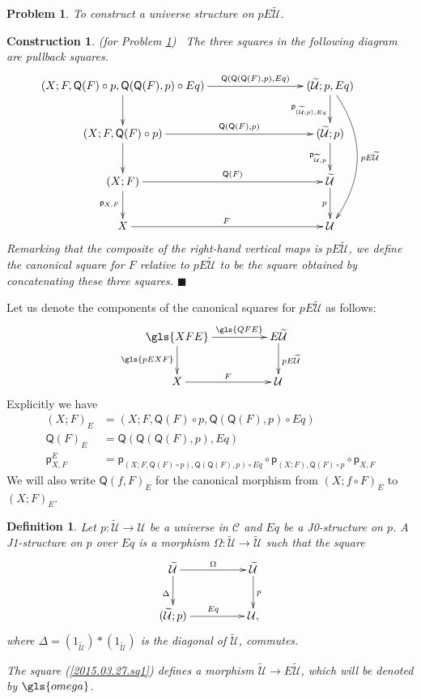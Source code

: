\documentclass[12pt]{article}
\numberwithin{equation}{section}
\newenvironment{eq}{\begin{equation}}{\end{equation}}
\newtheorem{definition}[proposition]{Definition}
\newtheorem{problem}[proposition]{Problem}
\newtheorem{construction0}[proposition]{Construction}
\newenvironment{construction}[1]{\begin{construction0}(for Problem \ref{#1})\ }{$\blacksquare$ \end{construction0}}
\newcommand{\sr}{\rightarrow}
\newcommand{\wt}{\widetilde}
\newcommand{\C}{{\mathcal C}}  %
\newcommand{\id}{1}            %
\newcommand{\p}{\mathsf{p}}
\newcommand{\U}{\mathcal{U}}
\newcommand{\Q}{\mathsf{Q}}
\begin{document}
\begin{problem}
\label{2015.05.08.prob1} To construct a universe structure on $pE\wt{\U}$.
\end{problem}
%
\begin{construction}{2015.05.08.prob1}\rm
\label{2015.05.08.constr1} The three squares in the following diagram are pullback squares.
\begin{eq}
  \begin{xy}
    \xymatrix@C=7pc{
      (X;F,\Q(F)\circ p, \Q(\Q(F),p)\circ Eq) \ar[r]^-{\Q(\Q(\Q(F),p),Eq)} \ar[d] & (\wt{\U}; p, Eq) \ar[d]_{\p_{(\wt{\U};p),Eq}} \ar@/^2pc/[ddd]^{pE\wt{\U}} \\
      (X;F,\Q(F)\circ p) \ar[r]^-{\Q(\Q(F),p)} \ar[d]                             & (\wt{\U};p) \ar[d]_{\p_{\wt{\U},p}} \\
      (X;F) \ar[r]^-{\Q(F)} \ar[d]_{\p_{X,F}}                                       & \wt{\U} \ar[d]_{p} \\
      X \ar[r]^{F}                                                                & \U
    }
  \end{xy}
\end{eq}%
Remarking that the composite of the right-hand vertical maps is $pE\wt{\U}$, we
define the canonical square for $F$ relative to $pE\wt{\U}$ to be the
square obtained by concatenating these three squares.
\end{construction}
%
Let us denote the components of the canonical squares for $pE\wt{\U}$ as
follows:
%
$$
\begin{xy}
          \xymatrix@C=4pc{ \gls{XFE} \ar[r]^-{\gls{QFE}} \ar[d]_{\gls{pEXF}} &
            E\wt{\U} \ar[d]^{pE\wt{\U}}\\ X \ar[r]^{F} & \U }
\end{xy}
$$
%
Explicitly we have
%
\begin{align*}
  (X;F)_{E}&=(X;F,\Q(F)\circ p, \Q(\Q(F),p)\circ Eq) \\
  \Q(F)_{E}&=\Q(\Q(\Q(F),p),Eq) \\
  \p_{X,F}^E&=\p_{(X;F,\Q(F)\circ p),\Q(\Q(F),p)\circ Eq}\circ \p_{(X;F),\Q(F)\circ p}\circ \p_{X,F}
\end{align*}
%
We will also write $\Q(f,F)_{E}$ for the canonical morphism from $(X;f\circ
F)_{E}$ to $(X;F)_{E}$.
%
\begin{definition}
\label{2015.03.27.def5} Let $p:\wt{\U}\sr \U$ be a universe in $\C$ and $Eq$ be a
J0-structure on $p$. A {\em J1-structure} on $p$ over $Eq$ is a morphism
$\Omega:\wt{\U}\sr \wt{\U}$ such that the square
%
\begin{eq}\label{2015.03.27.sq1}
\begin{xy}
          \xymatrix@C=4pc{ \wt{\U} \ar[r]^-{\Omega} \ar[d]_{\Delta} & \wt{\U}
            \ar[d]^{p}\\ (\wt{\U};p) \ar[r]^{Eq} & \U, }
\end{xy}
\end{eq}%
%
where $\Delta=(\id_{\wt{\U}})*(\id_{\wt{\U}})$ is the diagonal of $\wt{\U}$,
commutes.

The square (\ref{2015.03.27.sq1}) defines a morphism $\wt{\U}\sr E\wt{\U}$, which
will be denoted by $\gls{omega}$.

\end{definition}
%
\end{document}

